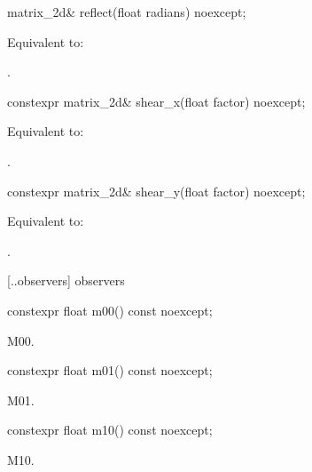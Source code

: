 %
\begin{itemdecl}
matrix_2d& reflect(float radians) noexcept;
\end{itemdecl}
\begin{itemdescr}
\pnum
\effects
Equivalent to: 

\pnum
\returns
{}.
\end{itemdescr}

%
\begin{itemdecl}
constexpr matrix_2d& shear_x(float factor) noexcept;
\end{itemdecl}
\begin{itemdescr}
\pnum
\effects
Equivalent to: 

\pnum
\returns
{}.
\end{itemdescr}

%
\begin{itemdecl}
constexpr matrix_2d& shear_y(float factor) noexcept;
\end{itemdecl}
\begin{itemdescr}
\pnum
\effects
Equivalent to: 

\pnum
\returns
{}.
\end{itemdescr}

 [\iotwod.\matrixtwod.observers] { observers}

%
\begin{itemdecl}
constexpr float m00() const noexcept;
\end{itemdecl}
\begin{itemdescr}
\pnum
\returns
M00.
\end{itemdescr}

%
\begin{itemdecl}
constexpr float m01() const noexcept;
\end{itemdecl}
\begin{itemdescr}
\pnum
\returns
M01.
\end{itemdescr}

%
\begin{itemdecl}
constexpr float m10() const noexcept;
\end{itemdecl}
\begin{itemdescr}
\pnum
\returns
M10.
\end{itemdescr}

